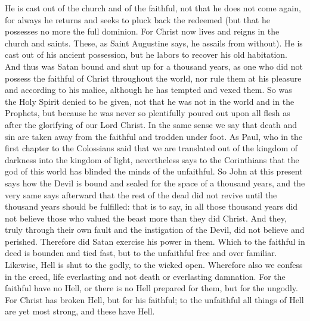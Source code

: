 He is cast out of the church and of the faithful, not that he does not come again, for always he returns and seeks to pluck back the redeemed (but that he possesses no more the full dominion. For Christ now lives and reigns in the church and saints. These, as Saint Augustine says, he assails from without). He is cast out of his ancient possession, but he labors to recover his old habitation. And thus was Satan bound and shut up for a thousand years, as one who did not possess the faithful of Christ throughout the world, nor rule them at his pleasure and according to his malice, although he has tempted and vexed them. So was the Holy Spirit denied to be given, not that he was not in the world and in the Prophets, but because he was never so plentifully poured out upon all flesh as after the glorifying of our Lord Christ. In the same sense we say that death and sin are taken away from the faithful and trodden under foot. As Paul, who in the first chapter to the Colossians said that we are translated out of the kingdom of darkness into the kingdom of light, nevertheless says to the Corinthians that the god of this world has blinded the minds of the unfaithful. So John at this present says how the Devil is bound and sealed for the space of a thousand years, and the very same says afterward that the rest of the dead did not revive until the thousand years should be fulfilled: that is to say, in all those thousand years did not believe those who valued the beast more than they did Christ. And they, truly through their own fault and the instigation of the Devil, did not believe and perished. Therefore did Satan exercise his power in them. Which to the faithful in deed is bounden and tied fast, but to the unfaithful free and over familiar. Likewise, Hell is shut to the godly, to the wicked open. Wherefore also we confess in the creed, life everlasting and not death or everlasting damnation. For the faithful have no Hell, or there is no Hell prepared for them, but for the ungodly. For Christ has broken Hell, but for his faithful; to the unfaithful all things of Hell are yet most strong, and these have Hell.

